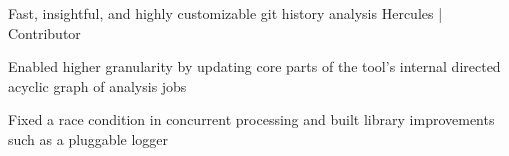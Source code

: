 \begin{cventries}
  \cventry
    {Fast, insightful, and highly customizable git history analysis} %
    {Hercules | Contributor} %
    {} %
    {} %
    {
      \begin{cvitems} %
        \item {Enabled higher granularity by updating core parts of the tool's internal directed acyclic graph of analysis jobs}
        \item {Fixed a race condition in concurrent processing and built library improvements such as a pluggable logger}
      \end{cvitems}
    }

\end{cventries}
